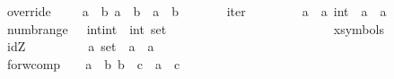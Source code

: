 \begin{isabellebody}
override\ \ \ \ \ {\isacharcolon}{\isacharcolon}{\isachardoublequoteopen}{\isacharbrackleft}{\isacharprime}a\ {\isacharless}{\isacharequal}{\isachargreater}\ {\isacharprime}b{\isacharcomma}\ {\isacharprime}a\ {\isacharless}{\isacharequal}{\isachargreater}\ {\isacharprime}b{\isacharbrackright}\ {\isacharequal}{\isachargreater}\ {\isacharparenleft}{\isacharprime}a\ {\isacharless}{\isacharequal}{\isachargreater}\ {\isacharprime}b{\isacharparenright}{\isachardoublequoteclose}\ \ {\isacharparenleft}{\isachardoublequoteopen}{\isacharunderscore}\ {\isacharprime}{\isacharparenleft}{\isacharplus}{\isacharprime}{\isacharparenright}\ {\isacharunderscore}{\isachardoublequoteclose}\ \ {\isacharbrackleft}{}{}{\isacharcomma}{}{}{\isacharbrackright}\ {}{}{\isacharparenright}\isanewline
iter\ \ \ \ \ \ \ \ \ {\isacharcolon}{\isacharcolon}{\isachardoublequoteopen}{\isacharbrackleft}{\isacharprime}a\ {\isacharless}{\isacharequal}{\isachargreater}\ {\isacharprime}a{\isacharcomma}\ int{\isacharbrackright}\ {\isacharequal}{\isachargreater}\ {\isacharparenleft}{\isacharprime}a\ {\isacharless}{\isacharequal}{\isachargreater}\ {\isacharprime}a{\isacharparenright}\ {\isachardoublequoteclose}\isanewline
numb{\isacharunderscore}range\ \ \ {\isacharcolon}{\isacharcolon}{\isachardoublequoteopen}{\isacharbrackleft}int{\isacharcomma}int{\isacharbrackright}\ {\isacharequal}{\isachargreater}\ {\isacharparenleft}int{\isacharparenright}\ set{\isachardoublequoteclose}\ \ \ \ \ \ \ \ \ \ \ \ \ \ \ \ \ {\isacharparenleft}{\isachardoublequoteopen}\ {\isacharunderscore}\ {\isachardot}{\isachardot}\ {\isacharunderscore}{\isachardoublequoteclose}\ \ \ \ {\isacharbrackleft}{}{}{\isacharcomma}{}{}{\isacharbrackright}\ {}{}{\isacharparenright}\isanewline
\isanewline
\isanewline
{}\isamarkupfalse%
\ {\isacharparenleft}xsymbols{\isacharparenright}\isanewline
idZ\ \ \ \ \ \ \ \ \ \ {\isacharcolon}{\isacharcolon}{\isachardoublequoteopen}{\isacharprime}a\ set\ {\isacharequal}{\isachargreater}\ {\isacharparenleft}{\isacharprime}a\ {\isacharless}{\isacharequal}{\isachargreater}\ {\isacharprime}a{\isacharparenright}{\isachardoublequoteclose}\ \ \ \ \ \ \ \ \ \ \ \ \ \ \ \ \ \ {\isacharparenleft}{\isachardoublequoteopen}{\isasymid}{\isachardoublequoteclose}{\isacharparenright}\isanewline
forw{\isacharunderscore}comp\ \ \ \ {\isacharcolon}{\isacharcolon}{\isachardoublequoteopen}{\isacharbrackleft}{\isacharprime}a\ {\isacharless}{\isacharequal}{\isachargreater}\ {\isacharprime}b{\isacharcomma}\ {\isacharprime}b\ {\isacharless}{\isacharequal}{\isachargreater}\ {\isacharprime}c{\isacharbrackright}\ {\isacharequal}{\isachargreater}\ {\isacharparenleft}{\isacharprime}a\ {\isacharless}{\isacharequal}{\isachargreater}\ {\isacharprime}c{\isacharparenright}{\isachardoublequoteclose}\ \ {\isacharparenleft}{\isachardoublequoteopen}{\isacharunderscore}\ {\isasymcomp}\ {\isacharunderscore}{\isachardoublequoteclose}\ \ {\isacharbrackleft}{}{}{\isacharcomma}{}{}{\isacharbrackright}\ {}{}{\isacharparenright}\isanewline

\end{isabellebody}
